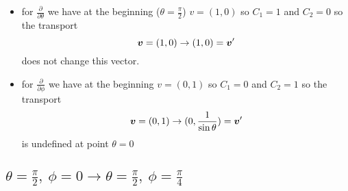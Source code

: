 \begin{itemize}
    \item for $\frac{\partial}{\partial \theta}$ we have at the beginning
          ($\theta = \frac{\pi}{2}$) $v=(1,0)$ so $C_1 = 1$ and $C_2 = 0$ so the
          transport
          \begin{equation}
              \boldsymbol{v} = (1,0) \rightarrow (1,0) = \boldsymbol{v}'
          \end{equation}
          does not change this vector.
    \item for $\frac{\partial}{\partial \phi}$ we have at the beginning
          $v=(0,1)$ so $C_1 = 0$ and $C_2 = 1$ so the transport
          \begin{equation}
              \boldsymbol{v} = (0,1) \rightarrow (0,\frac{1}{\sin\theta}) = \boldsymbol{v}'
          \end{equation}
          is undefined at point $\theta = 0$
\end{itemize}

\subsection*{$\theta = \frac{\pi}{2},~\phi = 0 \rightarrow \theta = \frac{\pi}{2},~ \phi = \frac{\pi}{4}$}

